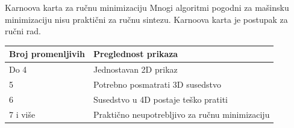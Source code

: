 \begin{frame}[label=02-s033]{Karnoova karta za ručnu minimizaciju}
Mnogi algoritmi pogodni za mašinsku minimizaciju nisu praktični za ručnu sintezu. Karnoova karta je postupak za ručni rad.
\par\vspace{5mm}
\begin{center}
\begin{tabular}{ll}
\toprule
Broj promenljivih & Preglednost prikaza \\
\midrule
Do 4 & Jednostavan 2D prikaz \\
5 & Potrebno posmatrati 3D susedstvo \\
6 & Susedstvo u 4D postaje teško pratiti \\
7 i više & Praktično neupotrebljivo za ručnu minimizaciju \\
\bottomrule
\end{tabular}
\end{center}
\end{frame}
